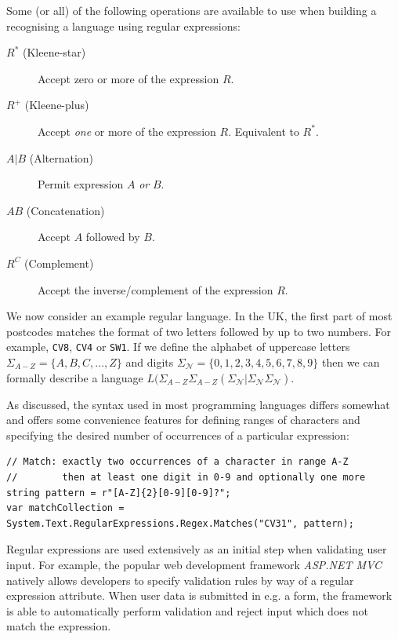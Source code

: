 \documentclass[a4paper,openany,12pt]{book}
\begin{document}
Some (or all) of the following operations are available to use when building a recognising a language using regular expressions:

\begin{description}
	\item[$R^*$ (Kleene-star)] Accept zero or more of the expression $R$.
	\item[$R^+$ (Kleene-plus)] Accept \emph{one} or more of the expression $R$. Equivalent to ${R^*}$.
	\item[$A \vert{} B$ (Alternation)] Permit expression $A$ \emph{or} $B$.
	\item[$AB$ (Concatenation)] Accept $A$ followed by $B$.
	\item[$R^C$ (Complement)] Accept the inverse/complement of the expression $R$.
\end{description}


We now consider an example regular language. In the UK, the first part of most postcodes matches the format of two letters followed by up to two numbers. For example, \texttt{CV8}, \texttt{CV4} or \texttt{SW1}. If we define the alphabet of uppercase letters $\Sigma_{A-Z} = \{A, B, C, \ldots, Z\}$ and digits $\Sigma_\mathcal{N} = \{0,1,2,3,4,5,6,7,8,9\}$ then we can formally describe a language $L(\Sigma_{A-Z} \Sigma_{A-Z}(\Sigma_\mathcal{N} | \Sigma_\mathcal{N} \Sigma_\mathcal{N})$.

As discussed, the syntax used in most programming languages differs somewhat and offers some convenience features for defining ranges of characters and specifying the desired number of occurrences of a particular expression:\\

\begin{verbatim}
// Match: exactly two occurrences of a character in range A-Z
//        then at least one digit in 0-9 and optionally one more
string pattern = r"[A-Z]{2}[0-9][0-9]?";
var matchCollection = System.Text.RegularExpressions.Regex.Matches("CV31", pattern);
\end{verbatim}

Regular expressions are used extensively as an initial step when validating user input. For example, the popular web development framework \emph{ASP.NET MVC} natively allows developers to specify validation rules by way of a regular expression attribute. When user data is submitted in e.g. a form, the framework is able to automatically perform validation and reject input which does not match the expression.
\end{document}
